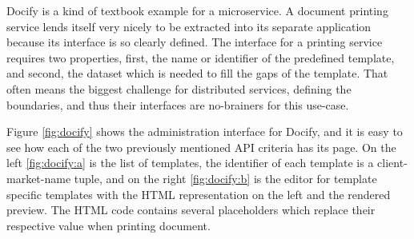 Docify is a kind of textbook example for a microservice. A document printing service lends itself very nicely to be extracted into its separate application because its interface is so clearly defined. The interface for a printing service requires two properties, first, the name or identifier of the predefined template, and second, the dataset which is needed to fill the gaps of the template. That often means the biggest challenge for distributed services, defining the boundaries, and thus their interfaces are no-brainers for this use-case.

Figure \ref{fig:docify} shows the administration interface for Docify, and it is easy to see how each of the two previously mentioned API criteria has its page. On the left \ref{fig:docify:a} is the list of templates, the identifier of each template is a client-market-name tuple, and on the right \ref{fig:docify:b} is the editor for template specific templates with the HTML representation on the left and the rendered preview. The HTML code contains several placeholders which replace their respective value when printing document.

